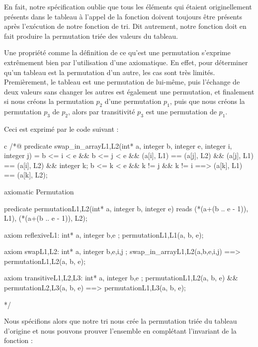 \documentclass[middle]{zmdocument}
\begin{document}
En fait, notre spécification oublie que tous les éléments qui étaient 
originellement présents dans le tableau à l'appel de la fonction doivent
toujours être présents après l'exécution de notre fonction de tri. Dit
autrement, notre fonction doit en fait produire la permutation triée des
valeurs du tableau.



Une propriété comme la définition de ce qu'est une permutation s'exprime 
extrêmement bien par l'utilisation d'une axiomatique. En effet, pour déterminer
qu'un tableau est la permutation d'un autre, les cas sont très limités. 
Premièrement, le tableau est une permutation de lui-même, puis l'échange de
deux valeurs sans changer les autres est également une permutation, et 
finalement si nous créons la permutation $p_2$ d'une permutation $p_1$, puis que 
nous créons la permutation $p_3$ de $p_2$, alors par transitivité $p_3$ est une
permutation de $p_1$.



Ceci est exprimé par le code suivant :



\begin{CodeBlock}{c}
/*@
  predicate swap_in_array{L1,L2}(int* a, integer b, integer e, integer i, integer j) =
    b <= i < e && b <= j < e &&
    \at(a[i], L1) == \at(a[j], L2) && \at(a[j], L1) == \at(a[i], L2) &&
    \forall integer k; b <= k < e && k != j && k != i ==> \at(a[k], L1) == \at(a[k], L2);

  axiomatic Permutation{
    predicate permutation{L1,L2}(int* a, integer b, integer e)
     reads \at(*(a+(b .. e - 1)), L1), \at(*(a+(b .. e - 1)), L2);

    axiom reflexive{L1}: 
      \forall int* a, integer b,e ; permutation{L1,L1}(a, b, e);

    axiom swap{L1,L2}:
      \forall int* a, integer b,e,i,j ;
        swap_in_array{L1,L2}(a,b,e,i,j) ==> permutation{L1,L2}(a, b, e);
	
    axiom transitive{L1,L2,L3}:
      \forall int* a, integer b,e ; 
        permutation{L1,L2}(a, b, e) && permutation{L2,L3}(a, b, e) ==> permutation{L1,L3}(a, b, e);
  }
*/
\end{CodeBlock}



Nous spécifions alors que notre tri nous crée la permutation triée du tableau
d'origine et nous pouvons prouver l'ensemble en complétant l'invariant de la
fonction :
\end{document}
